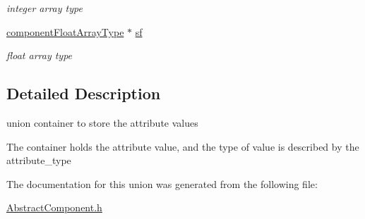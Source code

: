 \begin{DoxyCompactItemize}
\begin{DoxyCompactList}\small\item\em integer array type \end{DoxyCompactList}\item 
\hypertarget{unionattribute_container__union_af8f7cda67ab2f1ed902179e505598118}{\hyperlink{_abstract_component_8h_a55cf170262c3d7123f8b95208293e36d}{component\-Float\-Array\-Type} $\ast$ \hyperlink{unionattribute_container__union_af8f7cda67ab2f1ed902179e505598118}{sf}}\label{dd/d8b/unionattribute_container__union_af8f7cda67ab2f1ed902179e505598118}

\begin{DoxyCompactList}\small\item\em float array type \end{DoxyCompactList}\end{DoxyCompactItemize}


\subsection{Detailed Description}
union container to store the attribute values 

The container holds the attribute value, and the type of value is described by the attribute\-\_\-type 

The documentation for this union was generated from the following file\-:\begin{DoxyCompactItemize}
\item 
\hyperlink{_abstract_component_8h}{Abstract\-Component.\-h}\end{DoxyCompactItemize}
